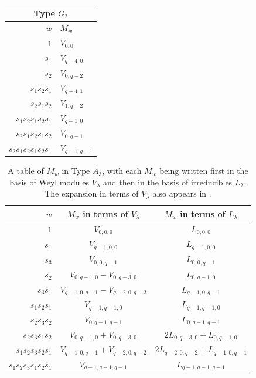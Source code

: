 \documentclass{amsart}
\theoremstyle{definition}
\begin{document}
\begin{table}[t]
\begin{tabular}{|r|l|}
\hline
\multicolumn{2}{||c||}{Type $G_2$}\\
\hline $w$ & $M_w$\\
\hline
$1$ & $V_{0,0}$ \\
    $s_1$ & $V_{q-4,0}$ \\
    $s_2$ & $V_{0,q-2}$ \\
    $s_1s_2s_1$ & $V_{q-4,1}$ \\
    $s_2s_1s_2$ & $V_{1,q-2}$ \\
    $s_1s_2s_1s_2s_1$ & $V_{q-1,0}$ \\
    $s_2s_1s_2s_1s_2$ & $V_{0,q-1}$ \\
    $s_2s_1s_2s_1s_2s_1$ & $V_{q-1,q-1}$ \\
    \hline
\end{tabular}
\end{table}
\begin{table}
\renewcommand{\arraystretch}{1.5}
\caption{A table of $M_w$ in Type $A_3$, with each $M_w$ being written first in the basis of Weyl modules $V_{\lambda}$ and then in the basis of irreducibles $L_{\lambda}$. The expansion in terms of $V_{\lambda}$ also appears in \cite[Section 2]{L}.}
    \label{tab:a3positivity}
    \centering
    \begin{tabular}{|r|c|c|}
\hline $w$ & $M_w$ in terms of $V_\lambda$ & $M_w$ in terms of $L_\lambda$\\
\hline
    $1$ & $V_{0,0,0}$ & $L_{0,0,0}$ \\
    $s_1$ & $V_{q-1,0,0}$ & $L_{q-1,0,0}$ \\
    $s_3$ & $V_{0,0,q-1}$ & $L_{0,0,q-1}$ \\
    $s_2$ & $V_{0,q-1,0} - V_{0,q-3,0}$ & $L_{0,q-1,0}$ \\
    $s_3s_1$ & $V_{q-1,0,q-1} - V_{q-2,0,q-2}$ & $L_{q-1,0,q-1}$\\
    $s_1s_2s_1$ & $V_{q-1,q-1,0}$ & $L_{q-1,q-1,0}$ \\
    $s_2s_3s_2$ & $V_{0,q-1,q-1}$ & $L_{0,q-1,q-1}$\\
    $s_2s_3s_1s_2$ & $V_{0,q-1,0} + V_{0,q-3,0}$ & $2L_{0,q-3,0} + L_{0,q-1,0}$ \\
    $s_1s_2s_3s_2s_1$ & $V_{q-1,0,q-1} + V_{q-2,0,q-2}$ & $2L_{q-2,0,q-2} + L_{q-1,0,q-1}$\\
    $s_1s_2s_3s_1s_2s_1$ & $V_{q-1,q-1,q-1}$ & $L_{q-1,q-1,q-1}$\\
    \hline
\end{tabular}
\end{table}
\end{document}
